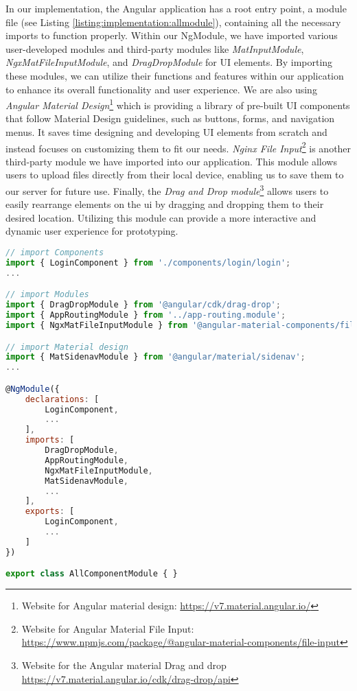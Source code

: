 In our implementation, the Angular application has a root entry point, a module file (see Listing \ref{listing:implementation:allmodule}), containing all the necessary imports to function properly. 
Within our NgModule, we have imported various user-developed modules and third-party modules like \textit{MatInputModule}, \textit{NgxMatFileInputModule}, and \textit{DragDropModule} for UI elements. 
By importing these modules, we can utilize their functions and features within our application to enhance its overall functionality and user experience.
We are also using \textit{Angular Material Design}\footnote{Website for Angular material design: \url{https://v7.material.angular.io/}} which is providing a library of pre-built UI components that follow Material Design guidelines, such as buttons, forms, and navigation menus. 
It saves time designing and developing UI elements from scratch and instead focuses on customizing them to fit our needs.
\textit{Nginx File Input}\footnote{Website for Angular Material File Input: \url{https://www.npmjs.com/package/@angular-material-components/file-input}} is another third-party module we have imported into our application. 
This module allows users to upload files directly from their local device, enabling us to save them to our server for future use.
Finally, the \textit{Drag and Drop module}\footnote{Website for the Angular material Drag and drop \url{https://v7.material.angular.io/cdk/drag-drop/api}} allows users to easily rearrange elements on the \ac{ui} by dragging and dropping them to their desired location. 
Utilizing this module can provide a more interactive and dynamic user experience for prototyping.

\begin{lstlisting}[language=JavaScript, caption=The File Defining All the Modules, label=listing:implementation:allmodule]
// import Components
import { LoginComponent } from './components/login/login';
...

// import Modules
import { DragDropModule } from '@angular/cdk/drag-drop';
import { AppRoutingModule } from '../app-routing.module';
import { NgxMatFileInputModule } from '@angular-material-components/file-input';

// import Material design
import { MatSidenavModule } from '@angular/material/sidenav';
...

@NgModule({
    declarations: [
        LoginComponent,
        ...
    ],
    imports: [
        DragDropModule,
        AppRoutingModule,
        NgxMatFileInputModule,
        MatSidenavModule,
        ...
    ],
    exports: [
        LoginComponent, 
        ...
    ]
})

export class AllComponentModule { }
\end{lstlisting}

